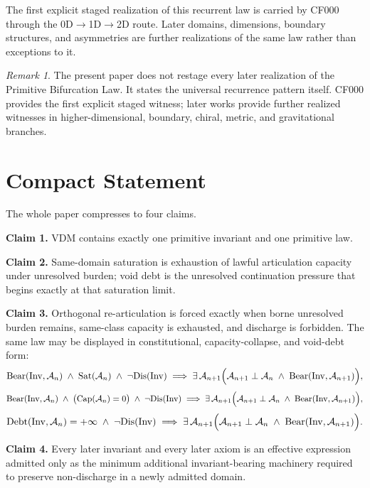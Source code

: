 \documentclass[11pt]{article}
\theoremstyle{definition}
\theoremstyle{plain}
\theoremstyle{remark}
\newtheorem{remark}{Remark}
\newcommand{\Inv}{\mathrm{Inv}}
\newcommand{\Sat}{\mathrm{Sat}}
\newcommand{\Bear}{\mathrm{Bear}}
\newcommand{\Dis}{\mathrm{Dis}}
\newcommand{\Debt}{\mathrm{Debt}}
\newcommand{\ArtCap}{\mathrm{Cap}}
\newcommand{\Aclass}{\mathcal{A}}
\begin{document}
The first explicit staged realization of this recurrent law is carried by
CF000 through the 0D$\to$1D$\to$2D route. Later domains, dimensions,
boundary structures, and asymmetries are further realizations of the same law
rather than exceptions to it.

\begin{remark}
The present paper does not restage every later realization of the Primitive
Bifurcation Law. It states the universal recurrence pattern itself. CF000
provides the first explicit staged witness; later works provide further
realized witnesses in higher-dimensional, boundary, chiral, metric, and
gravitational branches.
\end{remark}

\section{Compact Statement}

The whole paper compresses to four claims.

\medskip
\noindent\textbf{Claim 1.} VDM contains exactly one primitive invariant and one primitive law.

\medskip
\noindent\textbf{Claim 2.} Same-domain saturation is exhaustion of lawful articulation capacity under unresolved burden; void debt is the unresolved continuation pressure that begins exactly at that saturation limit.

\medskip
\noindent\textbf{Claim 3.} Orthogonal re-articulation is forced exactly when borne unresolved burden remains, same-class capacity is exhausted, and discharge is forbidden. The same law may be displayed in constitutional, capacity-collapse, and void-debt form:
\[
\Bear(\Inv,\Aclass_n)
\;\wedge\;
\Sat(\Aclass_n)
\;\wedge\;
\neg\Dis(\Inv)
\;\Longrightarrow\;
\exists \, \Aclass_{n+1}
\Bigl(
\Aclass_{n+1}\perp \Aclass_n
\;\wedge\;
\Bear(\Inv,\Aclass_{n+1})
\Bigr),
\]
\[
\Bear(\Inv,\Aclass_n)
\;\wedge\;
\bigl(\ArtCap(\Aclass_n)=0\bigr)
\;\wedge\;
\neg\Dis(\Inv)
\;\Longrightarrow\;
\exists \, \Aclass_{n+1}
\Bigl(
\Aclass_{n+1}\perp \Aclass_n
\;\wedge\;
\Bear(\Inv,\Aclass_{n+1})
\Bigr),
\]
\[
\Debt(\Inv,\Aclass_n)=+\infty
\;\wedge\;
\neg\Dis(\Inv)
\;\Longrightarrow\;
\exists \, \Aclass_{n+1}
\Bigl(
\Aclass_{n+1}\perp \Aclass_n
\;\wedge\;
\Bear(\Inv,\Aclass_{n+1})
\Bigr).
\]

\medskip
\noindent\textbf{Claim 4.} Every later invariant and every later axiom is an effective expression admitted only as the minimum additional invariant-bearing machinery required to preserve non-discharge in a newly admitted domain.
\medskip
\end{document}
